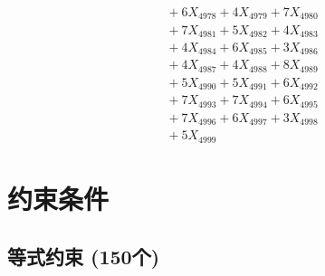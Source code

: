 \documentclass[a4paper,10pt]{article}
\begin{document}
{\begin{align}
&\;  + 6 X_{4978} + 4 X_{4979} + 7 X_{4980} \\[0.3ex]
&\;  + 7 X_{4981} + 5 X_{4982} + 4 X_{4983} \\[0.3ex]
&\;  + 4 X_{4984} + 6 X_{4985} + 3 X_{4986} \\[0.3ex]
&\;  + 4 X_{4987} + 4 X_{4988} + 8 X_{4989} \\[0.5ex]\allowbreak
&\;  + 5 X_{4990} + 5 X_{4991} + 6 X_{4992} \\[0.3ex]
&\;  + 7 X_{4993} + 7 X_{4994} + 6 X_{4995} \\[0.3ex]
&\;  + 7 X_{4996} + 6 X_{4997} + 3 X_{4998} \\[0.3ex]
&\;  + 5 X_{4999}\nonumber
\end{align}
}

\section{约束条件}

\subsection{等式约束 (150个)}
\end{document}
